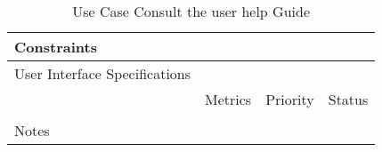 \begin{table}[H]
\begin{tabularx}{\linewidth}{|l|X|X|X|}
    \hline Constraints                   & \multicolumn{3}{l|}{}                                                                                 \\

    \hline User Interface Specifications & \multicolumn{3}{l|}{}                                                                                 \\

    \hline \multirow{2}{*}{}             & Metrics                                                                           & Priority & Status \\
    \cline{2-4}                          &                                                                                   &          &        \\
    \hline Notes                         & \multicolumn{3}{l|}{}                                                                                 \\
    \hline
  \end{tabularx}
  \caption{Use Case Consult the user help Guide}
  \label{tab:use_case_consult_the_user_help_Guide}
\end{table}


